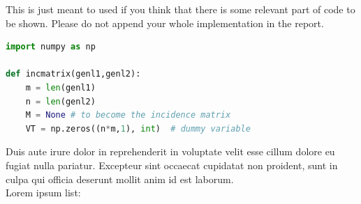 \documentclass[a4paper,11pt]{report}
\begin{document}
    This is just meant to used if you think that there is some relevant part of code to be shown. Please do not append your whole implementation in the report.
    \begin{lstlisting}[language=Python]
import numpy as np
    
def incmatrix(genl1,genl2):
    m = len(genl1)
    n = len(genl2)
    M = None # to become the incidence matrix
    VT = np.zeros((n*m,1), int)  # dummy variable

    \end{lstlisting}

    \newpage

    Duis aute irure dolor in reprehenderit in voluptate velit esse cillum dolore eu fugiat nulla pariatur. Excepteur sint occaecat cupidatat non proident, sunt in culpa qui officia deserunt mollit anim id est laborum. \\ Lorem ipsum list:




    
    
\end{document}
